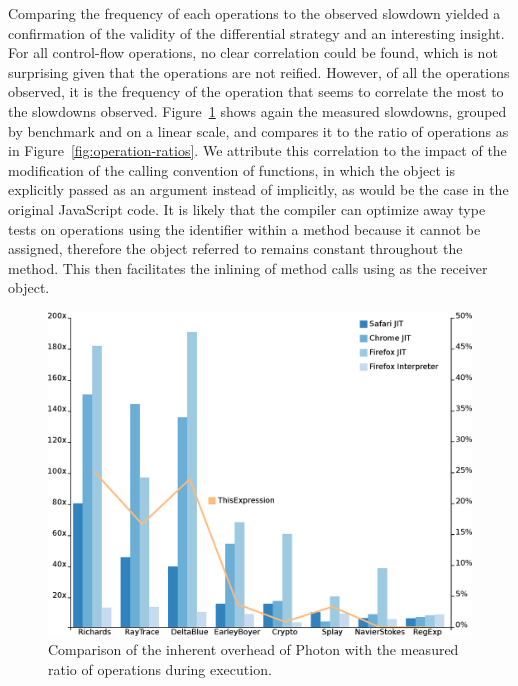 Comparing the frequency of each operations to the observed slowdown yielded a
confirmation of the validity of the differential strategy and an interesting
insight. For all control-flow operations, no clear correlation could be found,
which is not surprising given that the operations are not reified. However, of
all the operations observed, it is the frequency of the  operation
that seems to correlate the most to the slowdowns observed.
Figure~\ref{fig:slowdown-vs-this-ratio} shows again the measured slowdowns,
grouped by benchmark and on a linear scale, and compares it to the ratio of
 operations as in Figure~\ref{fig:operation-ratios}.  We attribute
this correlation to the impact of the modification of the calling convention of
functions, in which the  object is explicitly passed as an argument
instead of implicitly, as would be the case in the original JavaScript code. It
is likely that the compiler can optimize away type tests on operations using
the  identifier within a method because it cannot be assigned,
therefore the object referred to remains constant throughout the method. This
then facilitates the inlining of method calls using  as the receiver
object.

\begin{figure}[htbp]
\begin{center}
\includegraphics[width=.80\textwidth]{figures/slowdownVSThisRatio}
\caption[Slowdown and ratio of  operations]{Comparison of the inherent overhead of Photon with the measured ratio of  operations during execution.}
\label{fig:slowdown-vs-this-ratio}
\end{center}
\end{figure}

\FloatBarrier


